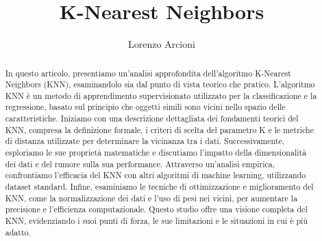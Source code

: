 \documentclass{article}
\title{K-Nearest Neighbors}
\author{Lorenzo Arcioni}
\begin{document}


\maketitle

\begin{abstract}
    In questo articolo, presentiamo un'analisi approfondita dell'algoritmo K-Nearest Neighbors (KNN), 
    esaminandolo sia dal punto di vista teorico che pratico. L'algoritmo KNN è un metodo di 
    apprendimento supervisionato utilizzato per la classificazione e la regressione, basato sul 
    principio che oggetti simili sono vicini nello spazio delle caratteristiche. Iniziamo con una 
    descrizione dettagliata dei fondamenti teorici del KNN, compresa la definizione formale, 
    i criteri di scelta del parametro K e le metriche di distanza utilizzate per determinare la 
    vicinanza tra i dati. Successivamente, esploriamo le sue proprietà matematiche e discutiamo l'impatto 
    della dimensionalità dei dati e del rumore sulla sua performance. Attraverso un'analisi empirica, 
    confrontiamo l'efficacia del KNN con altri algoritmi di machine learning, utilizzando dataset 
    standard. Infine, esaminiamo le tecniche di ottimizzazione e miglioramento del KNN, come 
    la normalizzazione dei dati e l'uso di pesi nei vicini, per aumentare la precisione e l'efficienza 
    computazionale. Questo studio offre una visione completa del KNN, evidenziando i suoi punti di forza, 
    le sue limitazioni e le situazioni in cui è più adatto. 
\end{abstract}

\tableofcontents







\nocite{*}


\end{document}
